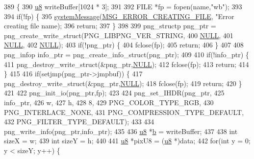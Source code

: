 \begin{DoxyCode}
389 \{
390   \mbox{\hyperlink{_system_8h_aed742c436da53c1080638ce6ef7d13de}{u8}} writeBuffer[1024 * 3];
391   
392   FILE *fp = fopen(name,\textcolor{stringliteral}{"wb"});
393 
394   \textcolor{keywordflow}{if}(!fp) \{
395     \mbox{\hyperlink{system_8cpp_a747a9cb8e015a3d45cca636b5bd0fc69}{systemMessage}}(\mbox{\hyperlink{_n_l_s_8h_a165f1f2539e202f0a24e6e9583c63475}{MSG\_ERROR\_CREATING\_FILE}}, \textcolor{stringliteral}{"Error creating file %
      name);
396     \textcolor{keywordflow}{return};
397   \}
398   
399   png\_structp png\_ptr = png\_create\_write\_struct(PNG\_LIBPNG\_VER\_STRING,
400                                                 \mbox{\hyperlink{getopt1_8c_a070d2ce7b6bb7e5c05602aa8c308d0c4}{NULL}},
401                                                 \mbox{\hyperlink{getopt1_8c_a070d2ce7b6bb7e5c05602aa8c308d0c4}{NULL}},
402                                                 \mbox{\hyperlink{getopt1_8c_a070d2ce7b6bb7e5c05602aa8c308d0c4}{NULL}});
403   \textcolor{keywordflow}{if}(!png\_ptr) \{
404     fclose(fp);
405     \textcolor{keywordflow}{return};
406   \}
407 
408   png\_infop info\_ptr = png\_create\_info\_struct(png\_ptr);
409 
410   \textcolor{keywordflow}{if}(!info\_ptr) \{
411     png\_destroy\_write\_struct(&png\_ptr,\mbox{\hyperlink{getopt1_8c_a070d2ce7b6bb7e5c05602aa8c308d0c4}{NULL}});
412     fclose(fp);
413     \textcolor{keywordflow}{return};
414   \}
415 
416   \textcolor{keywordflow}{if}(setjmp(png\_ptr->jmpbuf)) \{
417     png\_destroy\_write\_struct(&png\_ptr,\mbox{\hyperlink{getopt1_8c_a070d2ce7b6bb7e5c05602aa8c308d0c4}{NULL}});
418     fclose(fp);
419     \textcolor{keywordflow}{return};
420   \}
421 
422   png\_init\_io(png\_ptr,fp);
423 
424   png\_set\_IHDR(png\_ptr,
425                info\_ptr,
426                w,
427                h,
428                8,
429                PNG\_COLOR\_TYPE\_RGB,
430                PNG\_INTERLACE\_NONE,
431                PNG\_COMPRESSION\_TYPE\_DEFAULT,
432                PNG\_FILTER\_TYPE\_DEFAULT);
433 
434   png\_write\_info(png\_ptr,info\_ptr);
435 
436   \mbox{\hyperlink{_system_8h_aed742c436da53c1080638ce6ef7d13de}{u8}} *\mbox{\hyperlink{expr-lex_8cpp_a91b64995742fd30063314f12340b4b5a}{b}} = writeBuffer;
437 
438   \textcolor{keywordtype}{int} sizeX = w;
439   \textcolor{keywordtype}{int} sizeY = h;
440 
441   \mbox{\hyperlink{_system_8h_aed742c436da53c1080638ce6ef7d13de}{u8}} *pixU8 = (\mbox{\hyperlink{_system_8h_aed742c436da53c1080638ce6ef7d13de}{u8}} *)data;
442   \textcolor{keywordflow}{for}(\textcolor{keywordtype}{int} y = 0; y < sizeY; y++) \{
}
\end{DoxyCode}
